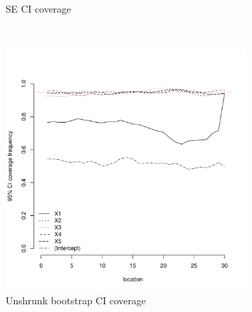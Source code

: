 \documentclass[authoryear, review, 11pt]{elsarticle}
\begin{document}
\begin{figure}
\begin{subfigure}[b]{0.45\textwidth}
		\caption{SE CI coverage}
	\end{subfigure}%
	\\%
	\begin{subfigure}[b]{0.45\textwidth}
	\centering
		\includegraphics[width=\textwidth]{../../figures/simulation/15.16.profile_unshrunk_bootstrap_coverage.pdf}
		\caption{Unshrunk bootstrap CI coverage}
	\end{subfigure}%
	~ %
	\begin{subfigure}[b]{0.45\textwidth}
	\centering

\end{subfigure}
\end{figure}
\end{document}
